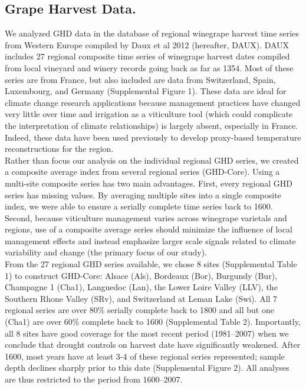 \documentclass[final]{nature}
\begin{document}

\begin{methods}
\subsection{Grape Harvest Data.}
\noindent We analyzed GHD data in the database of regional winegrape harvest time series from Western Europe compiled by Daux et al 2012 (hereafter, DAUX\cite{Daux2012}). DAUX includes 27 regional composite time series of winegrape harvest dates compiled from local vineyard and winery records going back as far as 1354. Most of these series are from France, but also included are data from Switzerland, Spain, Luxembourg, and Germany (Supplemental Figure 1). These data are ideal for climate change research applications because management practices have changed very little over time and irrigation as a viticulture tool (which could complicate the interpretation of climate relationships) is largely absent, especially in France. Indeed, these data have been used previously to develop proxy-based temperature reconstructions for the region\cite{Daux2012}.\\
\indent Rather than focus our analysis on the individual regional GHD series, we created a composite average index from several regional series (GHD-Core). Using a multi-site composite series has two main advantages. First, every regional GHD series has missing values. By averaging multiple sites into a single composite index, we were able to ensure a serially complete time series back to 1600. Second, because viticulture management varies across winegrape varietals and regions, use of a composite average series should minimize the influence of local management effects and instead emphasize larger scale signals related to climate variability and change (the primary focus of our study).\\
\indent From the 27 regional GHD series available, we chose 8 sites (Supplemental Table 1) to construct GHD-Core: Alsace (Als), Bordeaux (Bor), Burgundy (Bur), Champagne 1 (Cha1), Languedoc (Lan), the Lower Loire Valley (LLV), the Southern Rhone Valley (SRv), and Switzerland at Leman Lake (Swi). All 7 regional series are over 80\% serially complete back to 1800 and all but one (Cha1) are over 60\% complete back to 1600 (Supplemental Table 2). Importantly, all 8 sites have good coverage for the most recent period (1981--2007) when we conclude that drought controls on harvest date have significantly weakened. After 1600, most years have at least 3-4 of these regional series represented; sample depth declines sharply prior to this date (Supplemental Figure 2). All analyses are thus restricted to the period from 1600--2007.\\

\end{methods}
\end{document}
